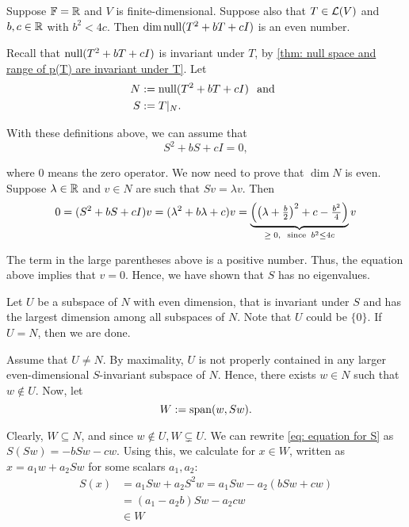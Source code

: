 \begin{thm}
  \label{thm: even-dimensional null space}
  Suppose $\mathbb{F} = \mathbb{R}$ and $V$ is finite-dimensional. Suppose also that $T \in \mathcal{L} (V)$ and $b,c \in \mathbb{R}$ with $b^2 < 4c$. Then $\dim \operatorname{null} (T^2 +bT +cI)$ is an even number.
\end{thm}
\begin{prf}
  Recall that $\operatorname{null} (T^2 +bT +cI)$ is invariant under $T$, by \ref{thm: null space and range of p(T) are invariant under T}. Let
  \begin{align}
    N &:= \operatorname{null} (T^2 +bT +cI) \;\;\, \text{and}\;\; \\
    S &:= T|_N.
  \end{align}

  With these definitions above, we can assume that
  \begin{equation}
    \label{eq: equation for S}
    S^2 + bS + cI = 0,
  \end{equation}

  where $0$ means the zero operator. We now need to prove that $\dim N$ is even. Suppose $\lambda \in \mathbb{R}$ and $v \in N$ are such that $Sv = \lambda v$. Then
  \begin{equation}
    0 = (S^2 + bS + cI)v = (\lambda ^2 + b \lambda + c)v = \underbrace{\left( \left( \lambda + \tfrac{b}{2}\right)^2 + c - \tfrac{b^2}{4} \right)}_{\geq \; 0, \;\;\, \text{since}\;\; b^2 \leq 4c} v
  \end{equation}

  The term in the large parentheses above is a positive number. Thus, the equation above implies that $v = 0$. Hence, we have shown that $S$ has no eigenvalues.

  Let $U$ be a subspace of $N$ with even dimension, that is invariant under $S$ and has the largest dimension among all subspaces of $N$. Note that $U$ could be $\{0\}$. If $U = N$, then we are done.

  Assume that $U \neq N$. By maximality, $U$ is not properly contained in any larger even-dimensional $S$-invariant subspace of $N$. Hence, there exists $w \in N$ such that $w \notin U$. Now, let
  \begin{equation}
    W := \operatorname{span} (w, Sw).
  \end{equation}

  Clearly, $W \subseteq N$, and since $w \notin U, W \subsetneq U$. We can rewrite \eqref{eq: equation for S} as $ S(Sw) = -bSw - cw $. Using this, we calculate for $x \in W$, written as $x = a_1 w + a_2 Sw$ for some scalars $a_1, a_2$:
  \begin{align}
    S(x) &= a_1 S w + a_2 S^2 w = a_1 S w - a_2 (b Sw + cw) \\
         &= (a_1 - a_2 b) Sw -  a_2 c  w \\
         & \in W
  \end{align}


\end{prf}
